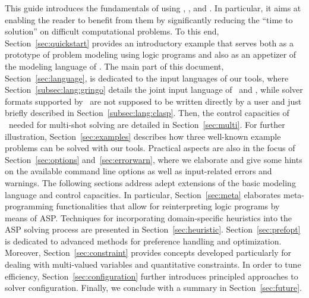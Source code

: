 This guide introduces the fundamentals of using
\gringo, \clasp, and \clingo.
In particular, it aims at enabling the reader to benefit from them
by significantly reducing the ``time to solution'' on difficult computational problems.
To this end,
Section~\ref{sec:quickstart} provides an introductory example 
that serves both as a prototype of problem modeling using logic programs
and also as an appetizer of the modeling language of \gringo.
The main part of this document, Section~\ref{sec:language},
is dedicated to the input languages of our tools,
where Section~\ref{subsec:lang:gringo}
details the joint input language of \gringo\ and \clingo,
while solver formats supported by \clasp\
are not supposed to be written directly by a user
and just briefly described in Section~\ref{subsec:lang:clasp}.
Then,
the control capacities of \clingo\ needed for multi-shot solving are detailed in Section~\ref{sec:multi}.
For further illustration,
Section~\ref{sec:examples} describes how three well-known example problems
can be solved with our tools.
Practical aspects are also in the focus of Section~\ref{sec:options} and~\ref{sec:errorwarn},
where we elaborate and give some hints on the available command line options
as well as input-related errors and warnings.
The following sections address adept extensions of the basic modeling language
and control capacities.
In particular, Section~\ref{sec:meta} elaborates meta-programming functionalities
that allow for reinterpreting logic programs by means of ASP.
Techniques for incorporating domain-specific heuristics into the ASP solving
process are presented in Section~\ref{sec:heuristic}.
Section~\ref{sec:prefopt} is dedicated to advanced methods
for preference handling and optimization.
Moreover, Section~\ref{sec:constraint} provides concepts developed particularly
for dealing with multi-valued variables and quantitative constraints.
In order to tune efficiency,
Section~\ref{sec:configuration} further introduces principled approaches
to solver configuration.
Finally, we conclude with a summary in Section~\ref{sec:future}.

